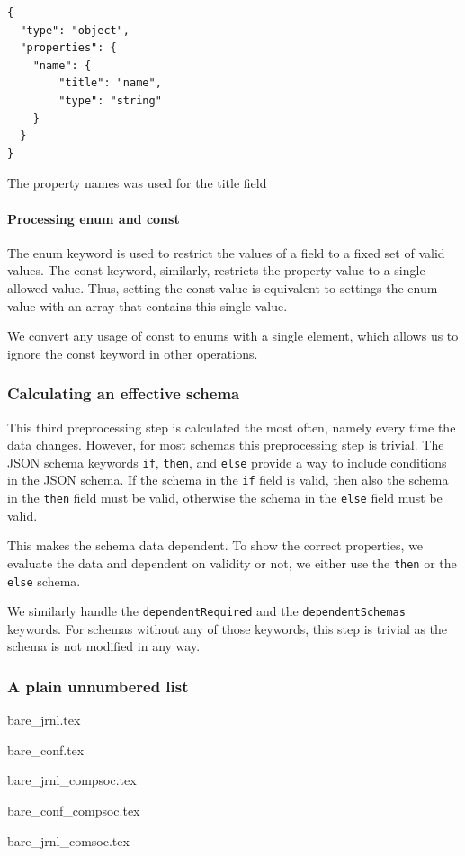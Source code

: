 \begin{listing}[!h]
    \begin{verbatim}
{
  "type": "object",
  "properties": {
    "name": {
        "title": "name",
        "type": "string"
    }
  }
}
    \end{verbatim}
    \caption{The property names was used for the title field}
    \label{listing:with-title}
\end{listing}

\paragraph{Processing enum and const}
The enum keyword is used to restrict the values of a field to a fixed set of valid values.
The const keyword, similarly, restricts the property value to a single allowed value.
Thus, setting the const value is equivalent to settings the enum value with an array that contains this single value.

We convert any usage of const to enums with a single element, which allows us to ignore the const keyword in other operations.

\subsubsection{Calculating an effective schema}

This third preprocessing step is calculated the most often, namely every time the data changes.
However, for most schemas this preprocessing step is trivial.
The JSON schema keywords \texttt{if}, \texttt{then}, and \texttt{else} provide a way to include conditions in the JSON schema.
If the schema in the \texttt{if} field is valid, then also the schema in the \texttt{then} field must be valid, otherwise the
schema in the \texttt{else} field must be valid.

This makes the schema data dependent.
To show the correct properties, we evaluate the data and dependent on validity or not, we either use the \texttt{then} or the \texttt{else} schema.

We similarly handle the \texttt{dependentRequired} and the \texttt{dependentSchemas} keywords.
For schemas without any of those keywords, this step is trivial as the schema is not modified in any way.


\subsubsection*{\bf A plain unnumbered list}
\begin{list}{}{}
    \item{bare\_jrnl.tex}
    \item{bare\_conf.tex}
    \item{bare\_jrnl\_compsoc.tex}
    \item{bare\_conf\_compsoc.tex}
    \item{bare\_jrnl\_comsoc.tex}
\end{list}

